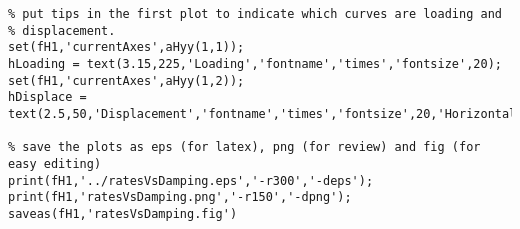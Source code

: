 \begin{lstlisting}
% put tips in the first plot to indicate which curves are loading and
% displacement.
set(fH1,'currentAxes',aHyy(1,1));
hLoading = text(3.15,225,'Loading','fontname','times','fontsize',20);
set(fH1,'currentAxes',aHyy(1,2));
hDisplace = text(2.5,50,'Displacement','fontname','times','fontsize',20,'HorizontalAlignment','right');

% save the plots as eps (for latex), png (for review) and fig (for easy editing)
print(fH1,'../ratesVsDamping.eps','-r300','-deps');
print(fH1,'ratesVsDamping.png','-r150','-dpng');
saveas(fH1,'ratesVsDamping.fig')
\end{lstlisting}
